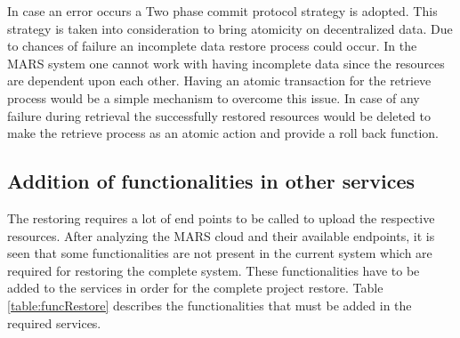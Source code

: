 In case an error occurs a Two phase commit protocol strategy is adopted. This strategy is taken into consideration to bring atomicity on decentralized data.
Due to chances of failure an incomplete data restore process could occur. In the MARS system one cannot work with having
incomplete data since the resources are dependent upon each other. Having an atomic transaction for the retrieve process would be a simple mechanism to overcome
this issue. In case of any failure during retrieval the successfully restored resources would be deleted to make the retrieve process as an atomic action and
provide a roll back function. 

\subsection{Addition of functionalities in other services}
The restoring requires a lot of end points to be called to upload the respective resources. After analyzing the MARS cloud and their available endpoints, it is
seen that some functionalities are not present in the current system which are required for restoring the complete system. These functionalities have to be
added to the services in order for the complete project restore. Table \ref{table:funcRestore} describes the functionalities that  must be
added in the required services.

